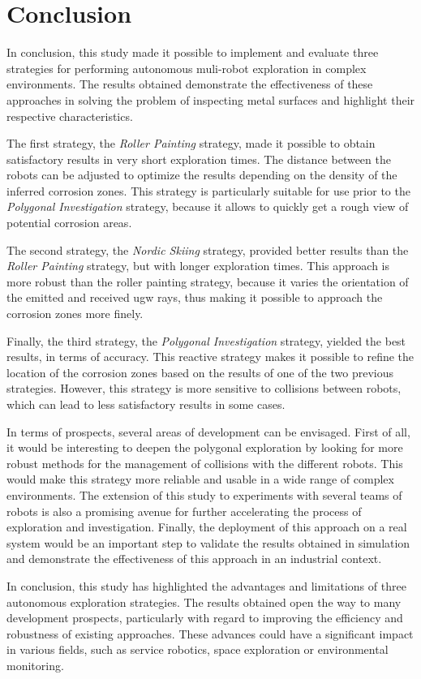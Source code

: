 
\chapter{Conclusion}

In conclusion, this study made it possible to implement and evaluate three strategies for performing autonomous muli-robot exploration in complex environments.
The results obtained demonstrate the effectiveness of these approaches in solving the problem of inspecting metal surfaces and highlight their respective characteristics.

The first strategy, the \textit{Roller Painting} strategy, made it possible to obtain satisfactory results in very short exploration times.
The distance between the robots can be adjusted to optimize the results depending on the density of the inferred corrosion zones.
This strategy is particularly suitable for use prior to the \textit{Polygonal Investigation} strategy, because it allows to quickly get a rough view of potential corrosion areas.

The second strategy, the \textit{Nordic Skiing} strategy, provided better results than the \textit{Roller Painting} strategy, but with longer exploration times.
This approach is more robust than the roller painting strategy, because it varies the orientation of the emitted and received \gls{ugw} rays, thus making it possible to approach the corrosion zones more finely.

Finally, the third strategy, the \textit{Polygonal Investigation} strategy, yielded the best results, in terms of accuracy.
This reactive strategy makes it possible to refine the location of the corrosion zones based on the results of one of the two previous strategies.
However, this strategy is more sensitive to collisions between robots, which can lead to less satisfactory results in some cases.

In terms of prospects, several areas of development can be envisaged.
First of all, it would be interesting to deepen the polygonal exploration by looking for more robust methods for the management of collisions with the different robots.
This would make this strategy more reliable and usable in a wide range of complex environments.
The extension of this study to experiments with several teams of robots is also a promising avenue for further accelerating the process of exploration and investigation.
Finally, the deployment of this approach on a real system would be an important step to validate the results obtained in simulation and demonstrate the effectiveness of this approach in an industrial context.

In conclusion, this study has highlighted the advantages and limitations of three autonomous exploration strategies. The results obtained open the way to many development prospects, particularly with regard to improving the efficiency and robustness of existing approaches. These advances could have a significant impact in various fields, such as service robotics, space exploration or environmental monitoring.

